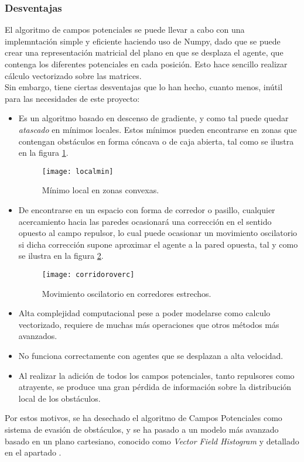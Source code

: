 \subsubsection{Desventajas}
El algoritmo de campos potenciales se puede llevar a cabo con una implemntación simple y eficiente haciendo uso de Numpy, dado que se puede crear una representación matricial del plano en que se desplaza el agente, que contenga los diferentes potenciales en cada posición. 
Esto hace sencillo realizar cálculo vectorizado sobre las matrices. \\Sin embargo, tiene ciertas desventajas que lo han hecho, cuanto menos, inútil para las necesidades de este proyecto:
\begin{itemize}
\item Es un algoritmo basado en descenso de gradiente, y como tal puede quedar \textit{atascado} en mínimos locales. Estos mínimos pueden encontrarse en zonas que contengan obstáculos en forma cóncava o de caja abierta, tal como se ilustra en la figura \ref{fig:localmin}.
\begin{figure}[H]
	\centering
	\texttt{[image: localmin]}
	\caption{Mínimo local en zonas convexas.}\label{fig:localmin}
\end{figure}
\item De encontrarse en un espacio con forma de corredor o pasillo, cualquier acercamiento hacia las paredes ocasionará una corrección en el sentido opuesto al campo repulsor, lo cual puede ocasionar un movimiento oscilatorio si dicha corrección supone aproximar el agente a la pared opuesta, tal y como se ilustra en la figura \ref{fig:corridoroverc}.
\begin{figure}[H]
	\centering
	\texttt{[image: corridoroverc]}
	\caption{Movimiento oscilatorio en corredores estrechos.}\label{fig:corridoroverc}
\end{figure}
\item Alta complejidad computacional pese a poder modelarse como calculo vectorizado, requiere de muchas más operaciones que otros métodos más avanzados.
\item No funciona correctamente con agentes que se desplazan a alta velocidad. 
\item Al realizar la adición de todos los campos potenciales, tanto repulsores como atrayente, se produce una gran pérdida de información sobre la distribución local de los obstáculos.
\end{itemize} 

Por estos motivos, se ha desechado el algoritmo de Campos Potenciales como sistema de evasión de obstáculos, y se ha pasado a un modelo más avanzado basado en un plano cartesiano, conocido como \textit{Vector Field Histogram} y detallado en el apartado . 

